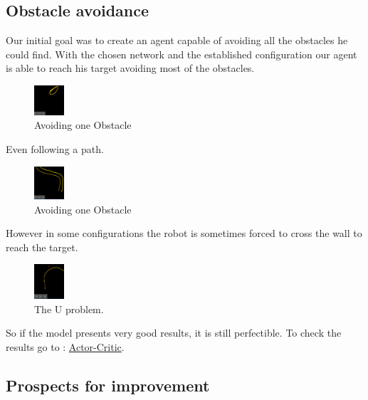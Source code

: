 \subsection*{Obstacle avoidance}
Our initial goal was to create an agent capable of avoiding all the obstacles he could find.
With the chosen network and the established configuration our agent is able to reach his target avoiding most of the obstacles. 
\begin{figure}[H]
    \centering
    \includegraphics[width=0.1\textwidth]{imgs/obstacle.png}
    \caption{\label{fig:method} Avoiding one Obstacle}
\end{figure}
Even following a path.
\begin{figure}[H]
    \centering
    \includegraphics[width=0.1\textwidth]{imgs/path.png}
    \caption{\label{fig:method} Avoiding one Obstacle}
\end{figure}
However in some configurations the robot is sometimes forced to cross the wall to reach the target.
\begin{figure}[H]
    \centering
    \includegraphics[width=0.1\textwidth]{imgs/U.png}
    \caption{\label{fig:method} The U problem.}
\end{figure}
So if the model presents very good results, it is still perfectible.
To check the results go to : \href{https://github.com/Paul-antoineLeTolguenec/Actor-critic}{Actor-Critic}.

\subsection*{Prospects for improvement}

